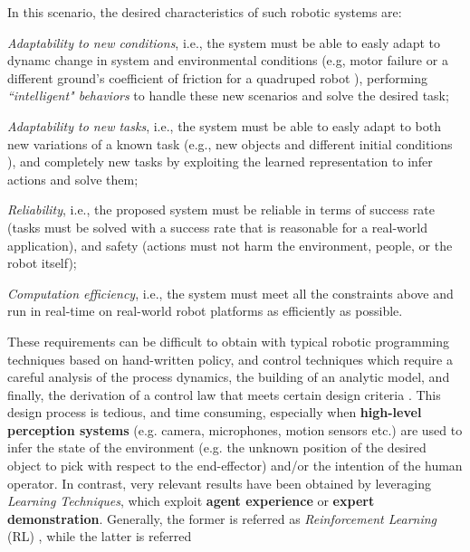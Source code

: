In this scenario, the desired characteristics of such robotic systems are: \begin{enumerate*}[label=\textbf{(\alph*)}]
    \item \textit{Adaptability to new conditions}, i.e., the system must be able to easly adapt to dynamc change in system and environmental conditions (e.g, motor failure or a different ground's coefficient of friction for a quadruped robot \cite{anne2021meta_learning_fast_adaptive}), performing \textit{``intelligent" behaviors} to handle these new scenarios and solve the desired task;  
    \item \textit{Adaptability to new tasks}, i.e., the system must be able to easly adapt to both new variations of a known task (e.g., new objects and different initial conditions \cite{mandi2022towards_more_generalizable_one_shot}), and completely new tasks \cite{jang2022bc_z} by exploiting the learned representation to infer actions and solve them;
    \item \textit{Reliability}, i.e., the proposed system must be reliable in terms of success rate (tasks must be solved with a success rate that is reasonable for a real-world application), and safety (actions must not harm the environment, people, or the robot itself);
    \item \textit{Computation efficiency}, i.e., the system must meet all the constraints above and run in real-time on real-world robot platforms as efficiently as possible. 
\end{enumerate*}
\newline These requirements can be difficult to obtain with typical robotic programming techniques based on hand-written
policy, and control techniques which require a careful analysis of the process dynamics, the building of an analytic
model, and finally, the derivation of a control law that meets certain design criteria
\cite{hafner2011reinforcement_in_feedback_controll}. This design process is tedious, and time consuming, especially when
\textbf{high-level perception systems} (e.g. camera, microphones, motion sensors etc.) are used to infer the state of
the environment (e.g. the unknown position of the desired object to pick with respect to the end-effector) and/or the
intention of the human operator. \newline In contrast, very relevant results have been obtained by leveraging
\textit{Learning Techniques}, which exploit \textbf{agent experience} or \textbf{expert demonstration}. Generally, the
former is referred as \textit{Reinforcement Learning} (RL) \cite{sutton2018reinforcement}, while the latter is referred
